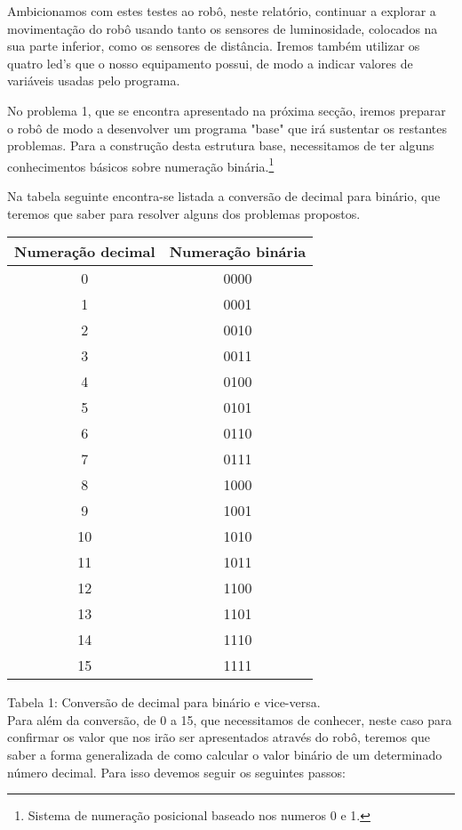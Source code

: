 \documentclass[a4paper, 12pt, onecolumn, oneside]{report}
\begin{document}
Ambicionamos com estes testes ao robô, neste relatório, continuar a  explorar  a movimentação do robô usando tanto os sensores de luminosidade, colocados na sua parte inferior, como os sensores de distância. Iremos também utilizar os quatro led's que o nosso equipamento possui, de modo a indicar valores de variáveis usadas pelo programa. 

No problema 1, que se encontra  apresentado na próxima secção, iremos preparar o robô de modo a desenvolver um programa "base" que irá sustentar os restantes problemas. 
Para a construção desta estrutura base, necessitamos de ter alguns conhecimentos básicos sobre numeração binária.\footnote{Sistema de numeração posicional baseado nos numeros 0 e 1.}

Na tabela seguinte encontra-se listada a conversão de decimal para binário, que teremos que saber para resolver alguns dos problemas propostos.



\begin{tabular}{|c|c|}
\hline
	Numeração decimal & Numeração binária\\
\hline
	0 & 0000\\
\hline
	1 & 0001\\
\hline
	2 & 0010\\
\hline
	3 & 0011\\
\hline
	4 & 0100\\
\hline
	5 & 0101\\
\hline
	6 & 0110\\
\hline
	7 & 0111\\
\hline
	8 & 1000\\
\hline
	9 & 1001\\
\hline
	10 & 1010\\
\hline
	11 & 1011\\
\hline
	12 & 1100\\
\hline
	13 & 1101\\
\hline
	14 & 1110\\
\hline
	15 & 1111\\
\hline
\end{tabular}


Tabela 1: Conversão de decimal para binário e vice-versa.
\\


Para além da conversão, de 0 a 15, que necessitamos de conhecer, neste caso para confirmar os valor que nos irão ser apresentados através do robô, teremos que saber a forma generalizada de como calcular o valor binário de um determinado número decimal. Para isso devemos seguir os seguintes passos: 
\end{document}
